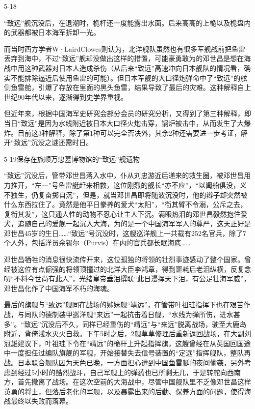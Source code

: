\documentclass[12pt,UTF8]{ctexbook}
\begin{document}
5-18

“致远”舰沉没后，在退潮时，桅杆还一度能露出水面。后来高高的上桅以及桅盘内的武器都被日本海军拆卸一光。

而当时西方学者W·LairdClowes则认为，北洋舰队虽然也有很多军舰战前把鱼雷丢弃到海中，不过“致远”舰却没做出这样的措置，可能豪勇敢为的邓世昌是想在海战中用这种武器对日本人造成杀伤（从后来“致远”高速冲向日本舰队的情况看，确实不能排除逼近后使用鱼雷的可能）。但日本军舰的大口径炮弹命中了“致远”的舷侧鱼雷舱，引爆了存放在里面的黑头鱼雷，结果导致了最后的灾难。这种解释自上世纪90年代以来，逐渐得到史学界重视。

但近年来，根据中国海军史研究会部分会员的研究分析，又得到了第三种解释，即当日“致远”是因为水线附近被日本大口径火炮击穿，锅炉被击中，从而发生了大爆炸。目前这3种解释，除了第1种可以完全否决外，其余2种还需要进一步考证，解开“致远”沉没之谜还需时日。

5-19保存在旅顺万忠墓博物馆的“致远”舰遗物

“致远”沉没后，管带邓世昌落入水中，仆从刘忠游近后递来的救生圈，被邓世昌用力推开，“左一”号鱼雷艇赶来相救，这位刚烈的舰长“亦不应”，“以阖船俱没，义不独生，仍复奋掷自沉”，但是，就当邓世昌即将随波沉没时，他的辫子却突然被什么东西拉住了。竟然是他平日豢养的爱犬“太阳”，“衔其臂不令溺，公斥之去，复衔其发”，这只通人性的动物不忍心让主人下沉。满眼热泪的邓世昌毅然抱住爱犬，追随自己的爱舰一起沉入大海，为的是一个中国海军军人的尊严，这天正好是邓世昌45岁的生日……“致远”号沉没时，这艘巡洋舰上一共载有252名官兵，除了7个人外，包括洋员余锡尔（Purvis）在内的官兵都长眠海底……

邓世昌牺牲的消息很快流传开来，这位孤独的将领的壮烈事迹感动了整个国家。曾经被这位有点倔强的将领顶撞过的北洋大臣李鸿章，得到噩耗后老泪纵横，反复念叨“不料今世尚有此人”，光绪皇帝垂泪撰联“此日漫挥天下泪，有公足壮海军威”，邓世昌化作了中国海军不朽的海魂。

最后的旗舰与“致远”舰同在战场的姊妹舰“靖远”，在管带叶祖珪指挥下也在艰苦作战，与同队的德制装甲巡洋舰“来远”一起抗击着日舰，“水线为弹所伤，进水甚多”。“致远”沉没后不久，同样已经重伤的“靖远”与“来远”脱离战场，驶至大鹿岛附近，背倚浅水灭火自救。下午5时之后，2舰草草修理后重新返回战场，在大副刘冠雄建议下，叶祖珪下令在“靖远”的桅杆上升起指挥旗，这艘曾经在从英国回国途中一度担任过编队旗舰的军舰，开始接替失去信号装置的“定远”指挥舰队，整队再战。日本联合舰队因为天色已晚，一方面担心遭到中国鱼雷艇的夜间偷袭，另外考虑到经过5小时的酷烈战斗，自己军舰上的弹药也已所剩无几，于是转舵向西南方，首先撤离了战场。在这次空前的大海战中，尽管中国舰队里不乏像邓世昌这样英勇的将士，但落后老化的军舰，以及暴露出来的后勤、保养方面的问题，使得海战最终以失败而落幕。
\end{document}
